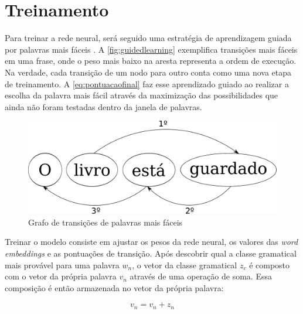 \section{Treinamento}

Para treinar a rede neural, será seguido uma estratégia de aprendizagem guiada por palavras mais fáceis \cite{shen2007guided}. A \autoref{fig:guidedlearning} exemplifica transições mais fáceis em uma frase, onde o peso mais baixo na aresta representa a ordem de execução. Na verdade, cada transição de um nodo para outro conta como uma nova etapa de treinamento. A \autoref{eq:pontuacaofinal} faz esse aprendizado guiado ao realizar a escolha da palavra mais fácil através da maximização das possibilidades que ainda não foram testadas dentro da janela de palavras.

\begin{figure}[htb]
	  \caption{Grafo de transições de palavras mais fáceis}\label{fig:guidedlearning}
	  \begin{center}
	      \includegraphics[scale=0.5]{img/guidedlearning.pdf}
	  \end{center}
\end{figure}

Treinar o modelo consiste em ajustar os pesos da rede neural, os valores das \textit{word embeddings} e as pontuações de transição. Após descobrir qual a classe gramatical mais provável para uma palavra $w_n$, o vetor da classe gramatical $z_c$ é composto com o vetor da própria palavra $v_n$ através de uma operação de soma. Essa composição é então armazenada no vetor da própria palavra:

\begin{equation} \label{eq:composicaovets}
v_n = v_n + z_n
\end{equation}


